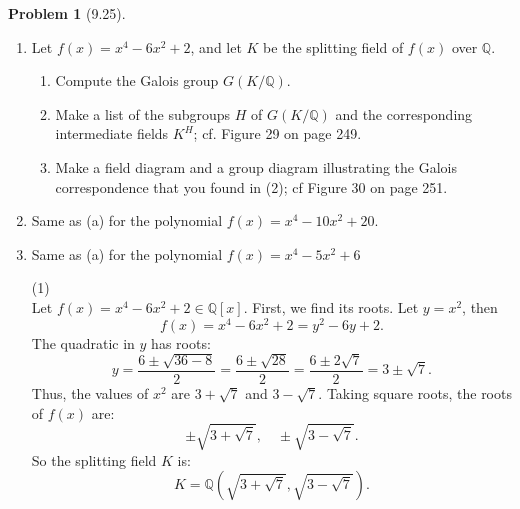\documentclass[12pt]{article}
\theoremstyle{definition}
\newtheorem{problem}{Problem}
\begin{document}
\begin{problem}[9.25]
    \phantom{.}
    \begin{enumerate}[label=(\alph*)]
        \item Let $f(x) = x^4 - 6x^2 + 2$, and let $K$ be the splitting field of $f(x)$ over $\mathbb{Q}$.
              \begin{enumerate}[label=(\arabic*)]
                  \item Compute the Galois group $G(K/\mathbb{Q})$.
                  \begin{solution}

                  \end{solution}

                  \item Make a list of the subgroups $H$ of $G(K/\mathbb{Q})$ and the corresponding intermediate fields $K^H$; cf. Figure 29 on page 249.
                  \begin{solution}

                  \end{solution}

                  \item Make a field diagram and a group diagram illustrating the Galois correspondence that you found in (2); cf Figure 30 on page 251.
                  \begin{solution}

                  \end{solution}
              \end{enumerate}

        \item Same as (a) for the polynomial $f(x) = x^4 - 10x^2 + 20$.
        \begin{solution}

        \end{solution}

        \item Same as (a) for the polynomial $f(x) = x^4 - 5x^2 + 6$
        
        \begin{solution}
            (1)\\
            Let $f(x) = x^4 - 6x^2 + 2 \in \mathbb{Q}[x]$. First, we find its roots. Let $y = x^2$, then
            \[
            f(x) = x^4 - 6x^2 + 2 = y^2 - 6y + 2.
            \]
            The quadratic in $y$ has roots:
            \[
            y = \frac{6 \pm \sqrt{36 - 8}}{2} = \frac{6 \pm \sqrt{28}}{2} = \frac{6 \pm 2\sqrt{7}}{2} = 3 \pm \sqrt{7}.
            \]
            Thus, the values of $x^2$ are $3 + \sqrt{7}$ and $3 - \sqrt{7}$. Taking square roots, the roots of $f(x)$ are:
            \[
            \pm\sqrt{3 + \sqrt{7}}, \quad \pm\sqrt{3 - \sqrt{7}}.
            \]
            So the splitting field $K$ is:
            \[
            K = \mathbb{Q}(\sqrt{3 + \sqrt{7}}, \sqrt{3 - \sqrt{7}}).
            \]


\end{solution}
\end{enumerate}
\end{problem}
\end{document}
